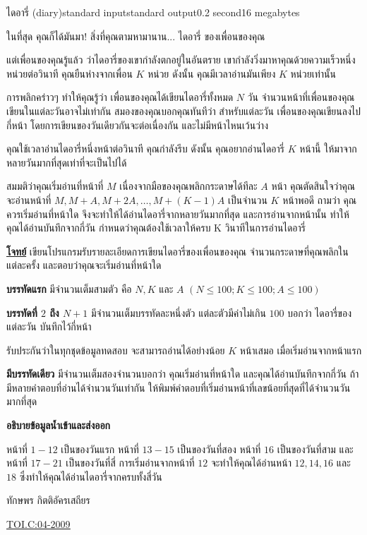 \documentclass[11pt,a4paper]{article}
\begin{document}
\begin{problem}{ไดอารี่ (diary)}{standard input}{standard output}{0.2 second}{16 megabytes}

ในที่สุด คุณก็ได้มันมา! สิ่งที่คุณตามหามานาน... ไดอารี่ ของเพื่อนของคุณ

      แต่เพื่อนของคุณรู้แล้ว ว่าไดอารี่ของเขากำลังตกอยู่ในอันตราย เขากำลังวิ่งมาหาคุณด้วยความเร็วหนึ่งหน่วยต่อวินาที คุณยืนห่างจากเพื่อน $K$ หน่วย ดังนั้น คุณมีเวลาอ่านมันเพียง $K$ หน่วยเท่านั้น

      การพลิกคร่าวๆ ทำให้คุณรู้ว่า เพื่อนของคุณได้เขียนไดอารี่ทั้งหมด $N$ วัน จำนวนหน้าที่เพื่อนของคุณเขียนในแต่ละวันอาจไม่เท่ากัน สมองของคุณบอกคุณทันทีว่า สำหรับแต่ละวัน เพื่อนของคุณเขียนลงไปกี่หน้า โดยการเขียนของวันเดียวกันจะต่อเนื่องกัน และไม่มีหน้าไหนเว้นว่าง

      คุณใช้เวลาอ่านไดอารี่หนึ่งหน้าต่อวินาที คุณกำลังรีบ ดังนั้น คุณอยากอ่านไดอารี่ $K$ หน้านี้ ให้มาจากหลายวันมากที่สุดเท่าที่จะเป็นไปได้

      สมมติว่าคุณเริ่มอ่านที่หน้าที่ $M$ เนื่องจากมือของคุณพลิกกระดาษได้ทีละ $A$ หน้า คุณตัดสินใจว่าคุณจะอ่านหน้าที่ $M,M+A,M+2A,… ,M+(K-1)A$  เป็นจำนวน $K$ หน้าพอดี ถามว่า คุณควรเริ่มอ่านที่หน้าใด จึงจะทำให้ได้อ่านไดอารี่จากหลายวันมากที่สุด และการอ่านจากหน้านั้น ทำให้คุณได้อ่านบันทึกจากกี่วัน กำหนดว่าคุณต้องใช้เวลาให้ครบ K วินาทีในการอ่านไดอารี่

\bigskip
\underline{\textbf{โจทย์}}  เขียนโปรแกรมรับรายละเอียดการเขียนไดอารี่ของเพื่อนของคุณ จำนวนกระดาษที่คุณพลิกในแต่ละครั้ง และตอบว่าคุณจะเริ่มอ่านที่หน้าใด

\InputFile

\textbf{ บรรทัดแรก} มีจำนวนเต็มสามตัว คือ $N, K$ และ $A$ $(N \leq 100; K \leq 100; A \leq 100)$

\textbf{บรรทัดที่ $2$ ถึง $N+1$} มีจำนวนเต็มบรรทัดละหนึ่งตัว แต่ละตัวมีค่าไม่เกิน $100$ บอกว่า ไดอารี่ของแต่ละวัน บันทึกไว้กี่หน้า

รับประกันว่าในทุกชุดข้อมูลทดสอบ จะสามารถอ่านได้อย่างน้อย $K$ หน้าเสมอ เมื่อเริ่มอ่านจากหน้าแรก

\OutputFile

\textbf{มีบรรทัดเดียว} มีจำนวนเต็มสองจำนวนบอกว่า คุณเริ่มอ่านที่หน้าใด และคุณได้อ่านบันทึกจากกี่วัน    ถ้ามีหลายคำตอบที่อ่านได้จำนวนวันเท่ากัน ให้พิมพ์คำตอบที่เริ่มอ่านหน้าที่เลขน้อยที่สุดที่ได้จำนวนวันมากที่สุด

\Examples

\begin{example}
%
\end{example}

\Note 

\textbf{อธิบายข้อมูลน้ำเข้าและส่งออก}

      หน้าที่ $1-12$ เป็นของวันแรก หน้าที่ $13-15$ เป็นของวันที่สอง หน้าที่ $16$ เป็นของวันที่สาม และหน้าที่ $17-21$ เป็นของวันที่สี่ การเริ่มอ่านจากหน้าที่ $12$ จะทำให้คุณได้อ่านหน้า $12, 14, 16$ และ $18$ ซึ่งทำให้คุณได้อ่านไดอารี่จากครบทั้งสี่วัน

\Source

ทักษพร กิตติอัครเสถียร

\underline{\href{http://www.thailandoi.org/toi.c/04-2009}{TOI.C:04-2009}}

\end{problem}
\end{document}

